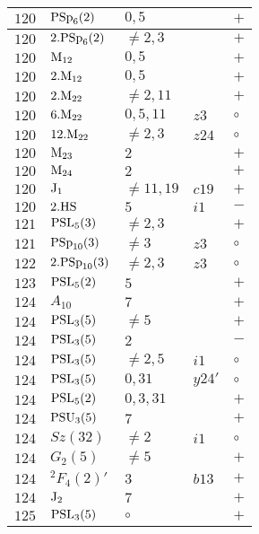 \documentclass[a4paper, 11pt]{article}
\begin{document}
\begin{longtable}{lllll}
		$120$ & ${\rm PSp}_{6}(2)$ & $0,5$ &  & $+$ \\ \hline
		$120$ & $2.{\rm PSp}_{6}(2)$ & $\neq 2,3$ &  & $+$ \\ \hline
		$120$ & ${\rm M}_{12}$ & $0,5$ &  & $+$ \\ \hline
		$120$ & $2.{\rm M}_{12}$ & $0,5$ &  & $+$ \\ \hline
		$120$ & $2.{\rm M}_{22}$ & $\neq 2,11$ &  & $+$ \\ \hline
		$120$ & $6.{\rm M}_{22}$ & $0,5,11$ & $z3$ & $\circ$ \\ \hline
		$120$ & $12.{\rm M}_{22}$ & $\neq 2,3$ & $z24$ & $\circ$ \\ \hline
		$120$ & ${\rm M}_{23}$ & $2$ &  & $+$ \\ \hline
		$120$ & ${\rm M}_{24}$ & $2$ &  & $+$ \\ \hline
		$120$ & ${\rm J}_1$ & $\neq 11,19$ & $c19$ & $+$ \\ \hline
		$120$ & $2.{\rm HS}$ & $5$ & $i1$ & $-$ \\ \hline
		$121$ & ${\rm PSL}_{5}(3)$ & $\neq 2,3$ &  & $+$ \\ \hline
		$121$ & ${\rm PSp}_{10}(3)$ & $\neq 3$ & $z3$ & $\circ$ \\ \hline
		$122$ & $2.{\rm PSp}_{10}(3)$ & $\neq 2,3$ & $z3$ & $\circ$ \\ \hline
		$123$ & ${\rm PSL}_{5}(2)$ & $5$ &  & $+$ \\ \hline
		$124$ & $A_{10}$ & $7$ &  & $+$ \\ \hline
		$124$ & ${\rm PSL}_{3}(5)$ & $\neq 5$ &  & $+$ \\ \hline
		$124$ & ${\rm PSL}_{3}(5)$ & $2$ &  & $-$ \\ \hline
		$124$ & ${\rm PSL}_{3}(5)$ & $\neq 2,5$ & $i1$ & $\circ$ \\ \hline
		$124$ & ${\rm PSL}_{3}(5)$ & $0,31$ & $y24'$ & $\circ$ \\ \hline
		$124$ & ${\rm PSL}_{5}(2)$ & $0, 3, 31$ &  & $+$ \\ \hline
		$124$ & ${\rm PSU}_{3}(5)$ & $7$ &  & $+$ \\ \hline
		$124$ & $Sz(32)$ & $\neq 2$ & $i1$ & $\circ$ \\ \hline
		$124$ & $G_{2}(5)$ & $\neq 5$ &  & $+$ \\ \hline
		$124$ & ${}^{2}F_{4}(2)'$ & $3$ & $b13$ & $+$ \\ \hline
		$124$ & ${\rm J}_2$ & $7$ &  & $+$ \\ \hline
		$125$ & ${\rm PSL}_{3}(5)$ & $\circ$ &  & $+$ \\ \hline

\end{longtable}
\end{document}
